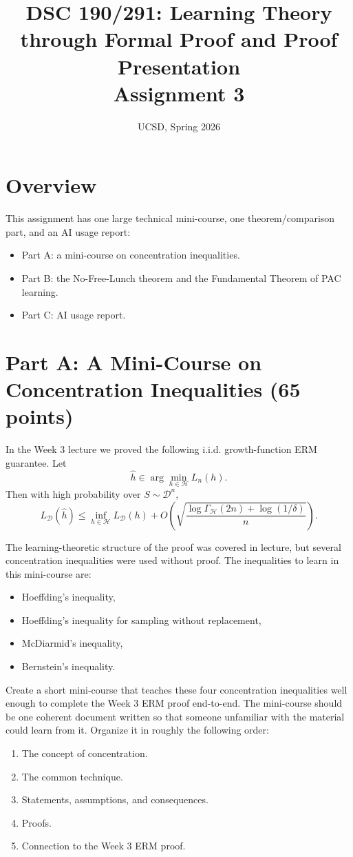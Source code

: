 \documentclass{article}
\title{DSC 190/291: Learning Theory through Formal Proof and Proof Presentation\\Assignment 3}
\date{UCSD, Spring 2026}
\begin{document}
\maketitle

\section{Overview}

This assignment has one large technical mini-course, one theorem/comparison part, and an AI usage report:
\begin{itemize}
\item Part A: a mini-course on concentration inequalities.
\item Part B: the No-Free-Lunch theorem and the Fundamental Theorem of PAC learning.
\item Part C: AI usage report.
\end{itemize}

\section{Part A: A Mini-Course on Concentration Inequalities (65 points)}

In the Week 3 lecture we proved the following i.i.d. growth-function ERM guarantee. Let
$$
\widehat{h} \in \arg\min_{h \in \mathcal{H}} L_n(h).
$$
Then with high probability over $S \sim \mathcal{D}^n$,
$$
L_{\mathcal{D}}(\widehat{h})
\le
\inf_{h \in \mathcal{H}} L_{\mathcal{D}}(h)
+ O\!\left(
\sqrt{\frac{\log \Gamma_{\mathcal{H}}(2n) + \log(1/\delta)}{n}}
\right).
$$

The learning-theoretic structure of the proof was covered in lecture, but several concentration inequalities were used without proof. The inequalities to learn in this mini-course are:
\begin{itemize}
\item Hoeffding's inequality,
\item Hoeffding's inequality for sampling without replacement,
\item McDiarmid's inequality,
\item Bernstein's inequality.
\end{itemize}

Create a short mini-course that teaches these four concentration inequalities well enough to complete the Week 3 ERM proof end-to-end. The mini-course should be one coherent document written so that someone unfamiliar with the material could learn from it. Organize it in roughly the following order:
\begin{enumerate}
\item The concept of concentration.
\item The common technique.
\item Statements, assumptions, and consequences.
\item Proofs.
\item Connection to the Week 3 ERM proof.
\end{enumerate}
\end{document}
